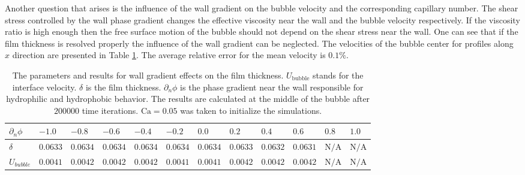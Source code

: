 \documentclass[preprint,12pt]{elsarticle}
\newcommand{\Ca}{\mathrm{Ca}}
\begin{document}
Another question that arises is the influence of the wall gradient on the bubble velocity and the
corresponding capillary number. The shear stress controlled by the wall phase gradient changes the
effective viscosity near the wall and the bubble velocity respectively. If the viscosity ratio is
high enough then the free surface motion of the bubble should not depend on the shear stress
near the wall.
One can see that if the film thickness is resolved properly the influence of the wall gradient can
be neglected. The velocities of the bubble center for profiles along $x$ direction are
presented in Table
\ref{table:parameters:wall:gradient}. 
The average relative error for the mean velocity is $0.1\%$.
\begin{table}
\begin{tabularx}{\textwidth}{|X|X X X X X X X X X X X|}
\hline
$\scriptstyle \partial_n \phi$& $\scriptstyle -1.0$& $\scriptstyle -0.8$&
$\scriptstyle -0.6$&$\scriptstyle -0.4$&$\scriptstyle -0.2$&$\scriptstyle
0.0$&$\scriptstyle 0.2$&$\scriptstyle 0.4$&$\scriptstyle 0.6$&$\scriptstyle 0.8$&$\scriptstyle
1.0$\\
\hline
$\scriptstyle \delta$& $\scriptstyle 0.0633$& $\scriptstyle 0.0634$& $\scriptstyle 0.0634$&
$\scriptstyle 0.0634$& $\scriptstyle 0.0634$& $\scriptstyle 0.0634$& $\scriptstyle 0.0633$&
$\scriptstyle 0.0632$& $\scriptstyle 0.0631$ &$\scriptstyle \mathrm{N/A}$&$\scriptstyle
\mathrm{N/A}$\\
\hline
$\scriptstyle U_{bubble}$ &$\scriptstyle 0.0041$& $\scriptstyle 0.0042$& $\scriptstyle 0.0042$
&$\scriptstyle 0.0042$ & $\scriptstyle 0.0041$& $\scriptstyle 0.0041$ & $\scriptstyle 0.0042$ &
$\scriptstyle 0.0042$ & $\scriptstyle 0.0042$ & $\scriptstyle \mathrm{N/A}$ &$\scriptstyle
\mathrm{N/A}$\\
\hline
\end{tabularx}
\caption{The parameters and results for wall gradient effects on the film thickness.
$U_{\mathrm{bubble}}$
stands for the interface velocity. $\delta$ is the film thickness. $\partial_n \phi$ is the phase
gradient near the wall responsible for hydrophilic and hydrophobic behavior. The results are
calculated at the middle of the bubble after $200 000$ time iterations. $\Ca=0.05$ was taken to
initialize the simulations.
\label{table:parameters:wall:gradient}}
\end{table}
\end{document}
